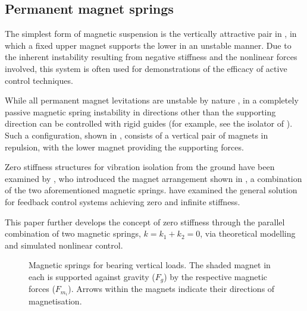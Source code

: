 \subsection{Permanent magnet springs}

The simplest form of magnetic suspension is the vertically
attractive pair in , in which a fixed upper
magnet supports the lower in an unstable manner. Due to the inherent
instability resulting from negative stiffness and the nonlinear
forces involved, this system is often used for demonstrations of the
efficacy of active control techniques.

While all permanent magnet levitations are unstable by nature
\cite{earnshaw1842,tonks1940}, in a completely passive magnetic
spring instability in directions other than the supporting direction
can be controlled with rigid guides (for example, see the isolator
of \textcite{puppin2002}). Such a configuration,
shown in , consists of a vertical pair of
magnets in repulsion, with the lower magnet providing the supporting
forces.

Zero stiffness structures for vibration isolation from the ground
have been examined by \textcite{nijsse2001}, who introduced the
magnet arrangement shown in , a combination of
the two aforementioned magnetic springs. \textcite{xing2005}
have examined the general solution for feedback control systems
achieving zero and infinite stiffness. \iffalse The latter, for
rejection of direct disturbance on the supported stage, has been
researched by \textcite{mizuno2003b}, in which the series
combination of a conventional positive spring and a negative
magnetic spring results in theoretically infinite static stiffness
in total:
\begin{align*}
\frac{1}{k} & = \frac{1}{k_1} + \frac{1}{k_2} , &
\therefore k & = \frac{k_1k_2}{k_1+k_2} = \infty, \text{~if~} k_1+k_2=0 .
\end{align*}
\fi

This paper further develops the concept of zero stiffness through
the parallel combination of two magnetic springs, $k = k_1+k_2 = 0$,
via theoretical modelling and simulated nonlinear control.

\begin{figure}
  \caption{%
    Magnetic springs for bearing vertical loads. The shaded magnet
    in each is supported against gravity ($F_g$) by the respective
    magnetic forces ($F_{m_i}$). Arrows within the magnets indicate their
    directions of magnetisation.}
\end{figure}

